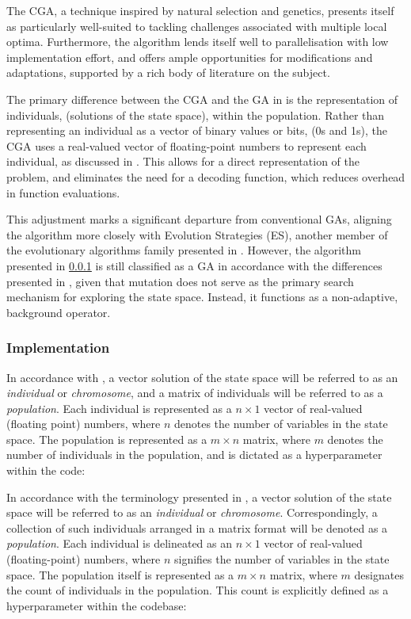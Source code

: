 \documentclass[10pt]{article}
\begin{document}
\begin{multicols}{2}
The CGA, a technique inspired by natural selection and genetics, presents itself as particularly well-suited to tackling challenges associated with multiple local optima. Furthermore, the algorithm lends itself well to parallelisation with low implementation effort, and offers ample opportunities for modifications and adaptations, supported by a rich body of literature on the subject.

The primary difference between the CGA and the GA in \cite{parks2023geneticalgorithms} is the representation of individuals, (solutions of the state space), within the population. Rather than representing an individual as a vector of binary values or bits, (0s and 1s), the CGA uses a real-valued vector of floating-point numbers to represent each individual, as discussed in \cite{PGA}. This allows for a direct representation of the problem, and eliminates the need for a decoding function, which reduces overhead in function evaluations.

This adjustment marks a significant departure from conventional GAs, aligning the algorithm more closely with Evolution Strategies (ES), another member of the evolutionary algorithms family presented in \cite{salimans2017evolution}. However, the algorithm presented in \ref{sec:CGA_implementation} is still classified as a GA in accordance with the differences presented in \cite{10.1007/BFb0029787}, given that mutation does not serve as the primary search mechanism for exploring the state space. Instead, it functions as a non-adaptive, background operator.

\subsubsection{Implementation}
\label{sec:CGA_implementation}

In accordance with \cite{parks2023geneticalgorithms}, a vector solution of the state space will be referred to as an \textit{individual} or \textit{chromosome}, and a matrix of individuals will be referred to as a \textit{population}. Each individual is represented as a $n \times 1$ vector of real-valued (floating point) numbers, where $n$ denotes the number of variables in the state space. The population is represented as a $m \times n$ matrix, where $m$ denotes the number of individuals in the population, and is dictated as a hyperparameter within the code: %

In accordance with the terminology presented in \cite{parks2023geneticalgorithms}, a vector solution of the state space will be referred to as an \textit{individual} or \textit{chromosome}. Correspondingly, a collection of such individuals arranged in a matrix format will be denoted as a \textit{population}. Each individual is delineated as an $n \times 1$ vector of real-valued (floating-point) numbers, where $n$ signifies the number of variables in the state space. The population itself is represented as a $m \times n$ matrix, where $m$ designates the count of individuals in the population. This count is explicitly defined as a hyperparameter within the codebase:



\end{multicols}
\end{document}
